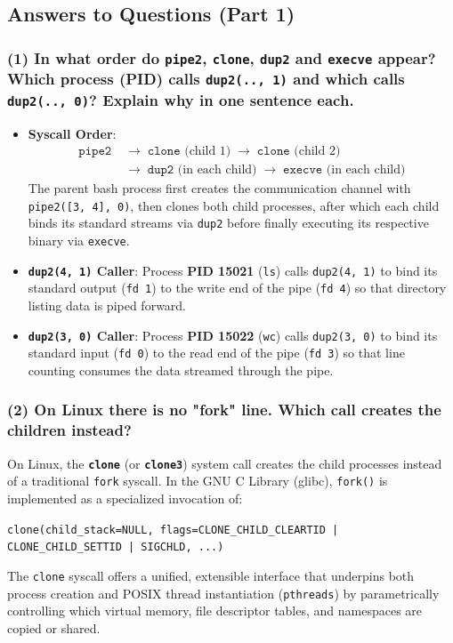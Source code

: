 \documentclass[12pt,a4paper]{article}
\begin{document}
\subsection{Answers to Questions (Part 1)}

\subsubsection*{(1) In what order do \texttt{pipe2}, \texttt{clone}, \texttt{dup2} and \texttt{execve} appear? Which process (PID) calls \texttt{dup2(.., 1)} and which calls \texttt{dup2(.., 0)}? Explain why in one sentence each.}
\begin{itemize}
    \item \textbf{Syscall Order}: 
    \begin{align*}
        \texttt{pipe2} &\;\longrightarrow\; \texttt{clone}\text{ (child 1)} \;\longrightarrow\; \texttt{clone}\text{ (child 2)} \\
        &\;\longrightarrow\; \texttt{dup2}\text{ (in each child)} \;\longrightarrow\; \texttt{execve}\text{ (in each child)}
    \end{align*}
    The parent bash process first creates the communication channel with \texttt{pipe2([3, 4], 0)}, then clones both child processes, after which each child binds its standard streams via \texttt{dup2} before finally executing its respective binary via \texttt{execve}.
    \item \textbf{\texttt{dup2(4, 1)} Caller}: Process \textbf{PID 15021} (\texttt{ls}) calls \texttt{dup2(4, 1)} to bind its standard output (\texttt{fd 1}) to the write end of the pipe (\texttt{fd 4}) so that directory listing data is piped forward.
    \item \textbf{\texttt{dup2(3, 0)} Caller}: Process \textbf{PID 15022} (\texttt{wc}) calls \texttt{dup2(3, 0)} to bind its standard input (\texttt{fd 0}) to the read end of the pipe (\texttt{fd 3}) so that line counting consumes the data streamed through the pipe.
\end{itemize}

\subsubsection*{(2) On Linux there is no "fork" line. Which call creates the children instead?}
On Linux, the \textbf{\texttt{clone}} (or \textbf{\texttt{clone3}}) system call creates the child processes instead of a traditional \texttt{fork} syscall. In the GNU C Library (glibc), \texttt{fork()} is implemented as a specialized invocation of:
\begin{center}
\texttt{clone(child\_stack=NULL, flags=CLONE\_CHILD\_CLEARTID | CLONE\_CHILD\_SETTID | SIGCHLD, ...)}
\end{center}
The \texttt{clone} syscall offers a unified, extensible interface that underpins both process creation and POSIX thread instantiation (\texttt{pthreads}) by parametrically controlling which virtual memory, file descriptor tables, and namespaces are copied or shared.
\end{document}
